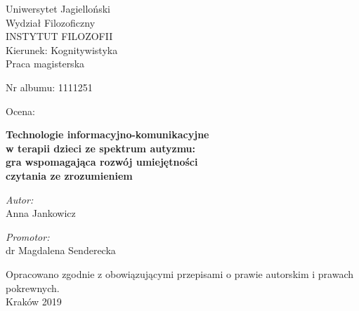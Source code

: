 \documentclass[a4paper,12pt]{report}
\title{\titlepl}
\author{\authorname}
\date{2019}
\newcommand{\authorname}{Anna Jankowicz}
\newcommand{\supname}{dr Magdalena Senderecka}
\newcommand{\titlepl}{Technologie informacyjno-komunikacyjne\\w terapii dzieci ze spektrum autyzmu:\\gra wspomagająca rozwój umiejętności\\czytania ze zrozumieniem}
\begin{document}

\thispagestyle{empty}

\vspace*{0.5cm}
{\centering\linespread{1.5}
    {\Large Uniwersytet Jagielloński\\Wydział Filozoficzny\\
        \uppercase{Instytut Filozofii}\\}
    {\large Kierunek: Kognitywistyka\\Praca magisterska\\}
}

\vspace{1cm}
\begin{minipage}[t]{0.4\textwidth}
    \begin{flushleft} \large Nr albumu: 1111251\\ \end{flushleft}
\end{minipage}
\begin{minipage}[t]{0.4\textwidth}
    \begin{flushright} \large Ocena:\\ \end{flushright}
\end{minipage}
\vspace{1cm}

{\centering\linespread{1.5}\LARGE\textbf{\titlepl\\}}

\vspace{2cm}
\begin{minipage}[t]{0.4\textwidth}
    \begin{flushleft} \large
    \emph{Autor:}\\ \authorname
    \end{flushleft}
\end{minipage}
\begin{minipage}[t]{0.5\textwidth}
    \begin{flushright} \large
    \emph{Promotor:}\\ \supname
    \end{flushright}
\end{minipage}
\vspace{1.75cm}

{\centering Opracowano zgodnie z obowiązującymi przepisami o prawie autorskim i prawach pokrewnych.\\ \vspace{0.25cm}\large{Kraków 2019\\}}
\end{document}
